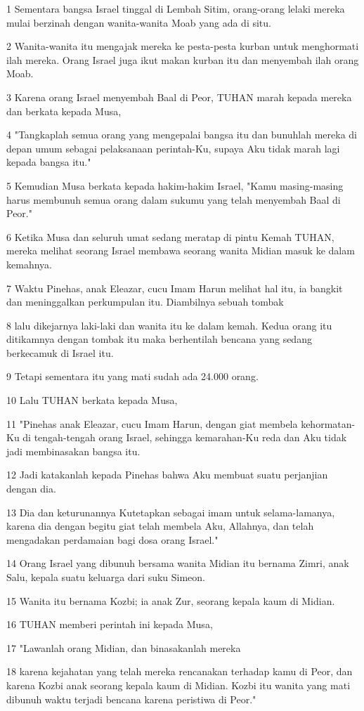 \par 1 Sementara bangsa Israel tinggal di Lembah Sitim, orang-orang lelaki mereka mulai berzinah dengan wanita-wanita Moab yang ada di situ.
\par 2 Wanita-wanita itu mengajak mereka ke pesta-pesta kurban untuk menghormati ilah mereka. Orang Israel juga ikut makan kurban itu dan menyembah ilah orang Moab.
\par 3 Karena orang Israel menyembah Baal di Peor, TUHAN marah kepada mereka dan berkata kepada Musa,
\par 4 "Tangkaplah semua orang yang mengepalai bangsa itu dan bunuhlah mereka di depan umum sebagai pelaksanaan perintah-Ku, supaya Aku tidak marah lagi kepada bangsa itu."
\par 5 Kemudian Musa berkata kepada hakim-hakim Israel, "Kamu masing-masing harus membunuh semua orang dalam sukumu yang telah menyembah Baal di Peor."
\par 6 Ketika Musa dan seluruh umat sedang meratap di pintu Kemah TUHAN, mereka melihat seorang Israel membawa seorang wanita Midian masuk ke dalam kemahnya.
\par 7 Waktu Pinehas, anak Eleazar, cucu Imam Harun melihat hal itu, ia bangkit dan meninggalkan perkumpulan itu. Diambilnya sebuah tombak
\par 8 lalu dikejarnya laki-laki dan wanita itu ke dalam kemah. Kedua orang itu ditikamnya dengan tombak itu maka berhentilah bencana yang sedang berkecamuk di Israel itu.
\par 9 Tetapi sementara itu yang mati sudah ada 24.000 orang.
\par 10 Lalu TUHAN berkata kepada Musa,
\par 11 "Pinehas anak Eleazar, cucu Imam Harun, dengan giat membela kehormatan-Ku di tengah-tengah orang Israel, sehingga kemarahan-Ku reda dan Aku tidak jadi membinasakan bangsa itu.
\par 12 Jadi katakanlah kepada Pinehas bahwa Aku membuat suatu perjanjian dengan dia.
\par 13 Dia dan keturunannya Kutetapkan sebagai imam untuk selama-lamanya, karena dia dengan begitu giat telah membela Aku, Allahnya, dan telah mengadakan perdamaian bagi dosa orang Israel."
\par 14 Orang Israel yang dibunuh bersama wanita Midian itu bernama Zimri, anak Salu, kepala suatu keluarga dari suku Simeon.
\par 15 Wanita itu bernama Kozbi; ia anak Zur, seorang kepala kaum di Midian.
\par 16 TUHAN memberi perintah ini kepada Musa,
\par 17 "Lawanlah orang Midian, dan binasakanlah mereka
\par 18 karena kejahatan yang telah mereka rencanakan terhadap kamu di Peor, dan karena Kozbi anak seorang kepala kaum di Midian. Kozbi itu wanita yang mati dibunuh waktu terjadi bencana karena peristiwa di Peor."

